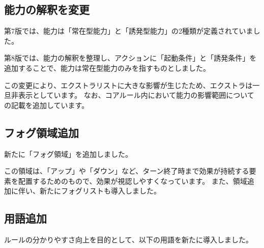 \documentclass[letterpaper,10pt,dvipdfmx]{sphinxmanual}
\makeatletter
\renewcommand\sphinxlineitem[2]{%
  \sphinx@gobto@sphinxlineitem#2\@gobbletwo\sphinxlineitem\unless
  \iftrue
    \spx@lineitemlabel\expandafter{\the\spx@lineitemlabel\strut#1\\}%
  \else
    \item[\kern\labelwidth\kern-\itemindent\kern-\leftmargin
          {\parbox[t]{1.4\linewidth}{%
          \raggedright
          \the\spx@lineitemlabel%
          \strut#1}}%
          \kern-\labelsep]%
    \spx@lineitemlabel{}%
    \leavevmode
  \fi #2%
}
\makeatother
\begin{document}
\subsection{能力の解釈を変更}
\label{\detokenize{revision-history/8th:id2}}
\sphinxAtStartPar
第7版では、能力は「常在型能力」と「誘発型能力」の2種類が定義されていました。

\sphinxAtStartPar
第8版では、能力の解釈を整理し、アクションに「起動条件」と「誘発条件」を追加することで、能力は常在型能力のみを指すものとしました。

\sphinxAtStartPar
この変更により、エクストラリストに大きな影響が生じたため、エクストラは一旦非表示としています。
なお、コアルール内において能力の影響範囲についての記載を追加しています。


\subsection{フォグ領域追加}
\label{\detokenize{revision-history/8th:id3}}
\sphinxAtStartPar
新たに「フォグ領域」を追加しました。

\sphinxAtStartPar
この領域は、「アップ」や「ダウン」など、ターン終了時まで効果が持続する要素を配置するためのもので、効果が視認しやすくなっています。
また、領域追加に伴い、新たにフォグリストも導入しました。


\subsection{用語追加}
\label{\detokenize{revision-history/8th:id4}}
\sphinxAtStartPar
ルールの分かりやすさ向上を目的として、以下の用語を新たに導入しました。
\end{document}
